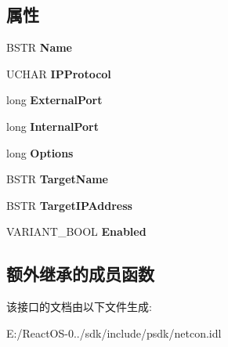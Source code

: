 \subsection*{属性}
\begin{DoxyCompactItemize}
\item 
\mbox{\label{interface_i_net_sharing_port_mapping_props_a0818822ae551545f036c4d6af14c5691}} 
B\+S\+TR {\bfseries Name}
\item 
\mbox{\label{interface_i_net_sharing_port_mapping_props_abd130694227840bd99fc21735a072197}} 
U\+C\+H\+AR {\bfseries I\+P\+Protocol}
\item 
\mbox{\label{interface_i_net_sharing_port_mapping_props_a24e3f0884fc93b546ad6ef74d37a8720}} 
long {\bfseries External\+Port}
\item 
\mbox{\label{interface_i_net_sharing_port_mapping_props_ae54b7c89fa70b0423cee8ad26f8dfcf5}} 
long {\bfseries Internal\+Port}
\item 
\mbox{\label{interface_i_net_sharing_port_mapping_props_a285782b5f712428eb422d38c300790f9}} 
long {\bfseries Options}
\item 
\mbox{\label{interface_i_net_sharing_port_mapping_props_a0338627a5d25a7f312256ccd9d5b03b0}} 
B\+S\+TR {\bfseries Target\+Name}
\item 
\mbox{\label{interface_i_net_sharing_port_mapping_props_a7e7c9cca0438bdaa73912a5d4636ba23}} 
B\+S\+TR {\bfseries Target\+I\+P\+Address}
\item 
\mbox{\label{interface_i_net_sharing_port_mapping_props_a2d7da58f9af326c76290963f8895c0e9}} 
V\+A\+R\+I\+A\+N\+T\+\_\+\+B\+O\+OL {\bfseries Enabled}
\end{DoxyCompactItemize}
\subsection*{额外继承的成员函数}


该接口的文档由以下文件生成\+:\begin{DoxyCompactItemize}
\item 
E\+:/\+React\+O\+S-\/0../sdk/include/psdk/netcon.\+idl\end{DoxyCompactItemize}
